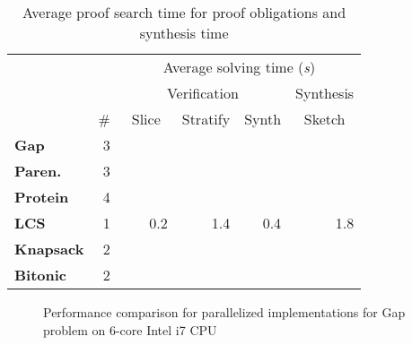\begin{table}
\centering
\renewcommand\a{({\it i})}    %
\renewcommand\b{({\it ii})}
\renewcommand\c{({\it iii})}
\begin{tabular}{|l|r|rrr|r|}
  \cline{2-6}
  \multicolumn{1}{c|}{} &    & \multicolumn{4}{c|}{\small Average solving time ({\it s})}  \\
  \multicolumn{1}{c|}{} &    & \multicolumn{3}{c|}{\small Verification} & {\small Synthesis} \\
  \multicolumn{1}{c|}{} & \# & \multicolumn{1}{c|}{~\sf Slice~} & \multicolumn{1}{c|}{\sf Stratify} & \multicolumn{1}{c|}{\sf Synth} & \multicolumn{1}{c|}{Sketch} \\
  \hline
  {\bf Gap} & 3 &  & \\
  \hline
  {\bf Paren.} & 3 & & \\
  \hline
  {\bf Protein} & 4 & & \\
  \hline
  {\bf LCS} & 1 &  0.2  &  1.4  &  0.4  &  1.8 \\
  \hline
  {\bf Knapsack} & 2 & & \\
  \hline
  {\bf Bitonic} & 2 & & \\
  \hline
\end{tabular}
\caption{\label{evaluation:solving time}
  Average proof search time for proof obligations and synthesis
  time}
\end{table}



\begin{figure}

\caption{\label{fig:gap} Performance comparison for parallelized implementations for Gap problem on 6-core Intel i7 CPU}
\end{figure}